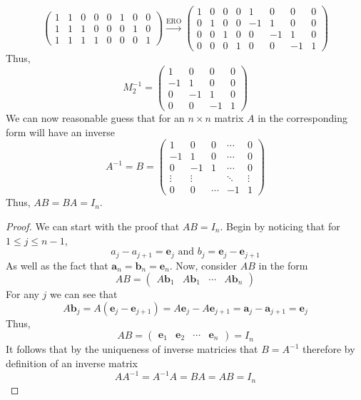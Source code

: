 \documentclass{exam}
\begin{document}
\begin{solution}
\[\begin{pmatrix}
            1 & 1 & 0 & 0 & 0 & 1 & 0 & 0 \\
            1 & 1 & 1 & 0 & 0 & 0 & 1 & 0 \\
            1 & 1 & 1 & 1 & 0 & 0 & 0 & 1
        \end{pmatrix}
        \xrightarrow{\text{ERO}}
        \begin{pmatrix}
            1 & 0 & 0 & 0 & 1 & 0 & 0 & 0 \\
            0 & 1 & 0 & 0 & -1 & 1 & 0 & 0 \\
            0 & 0 & 1 & 0 & 0 & -1 & 1 & 0 \\
            0 & 0 & 0 & 1 & 0 & 0 & -1 & 1 
        \end{pmatrix}
    \]
    Thus, 
    \[
        M_2^{-1} = \begin{pmatrix}
            1 & 0 & 0 & 0 \\ 
            -1 & 1 & 0 & 0 \\
            0 & -1 & 1 & 0 \\
            0 & 0 & -1 & 1
        \end{pmatrix}
    \]
    We can now reasonable guess that for an $n \times n$ matrix $A$ in the corresponding form will have an inverse 
    \[
        A^{-1} = B = \begin{pmatrix}
            1 & 0 & 0 & \cdots & 0 \\
            -1 & 1 & 0 & \cdots & 0 \\
            0 & -1 & 1 & \cdots & 0 \\
            \vdots & \vdots & & \ddots & \vdots \\
            0 & 0 & \cdots & -1 & 1
        \end{pmatrix}
    \]
    Thus, $AB = BA = I_n$.
    \begin{proof}
        We can start with the proof that $AB=I_n$. Begin by noticing that for $1 \leq j \leq n-1$, 
        \[a_j - a_{j+1} = \mathbf{e}_j \text{ and } b_j = \mathbf{e}_j - \mathbf{e}_{j+1}\]
        As well as the fact that $\mathbf{a}_n = \mathbf{b}_n = \mathbf{e}_n$. Now, consider $AB$ in the form 
        \[AB = \begin{pmatrix} A\mathbf{b}_1 & A\mathbf{b}_1 & \cdots & A\mathbf{b}_n \end{pmatrix}\]
        For any $j$ we can see that 
        \[A\mathbf{b}_j = A\left(\mathbf{e}_j - \mathbf{e}_{j+1}\right) = A\mathbf{e}_j - A\mathbf{e}_{j+1} = \mathbf{a}_j - \mathbf{a}_{j+1} = \mathbf{e}_j\]
        Thus, 
        \[AB = \begin{pmatrix} \mathbf{e}_1 & \mathbf{e}_2 & \cdots & \mathbf{e}_n \end{pmatrix} = I_n\]
        It follows that by the uniqueness of inverse matricies that $B = A^{-1}$ therefore by definition of an inverse matrix 
        \[
            AA^{-1} = A^{-1}A = BA = AB = I_n
        \]
    \end{proof}
\end{solution}
\end{document}

